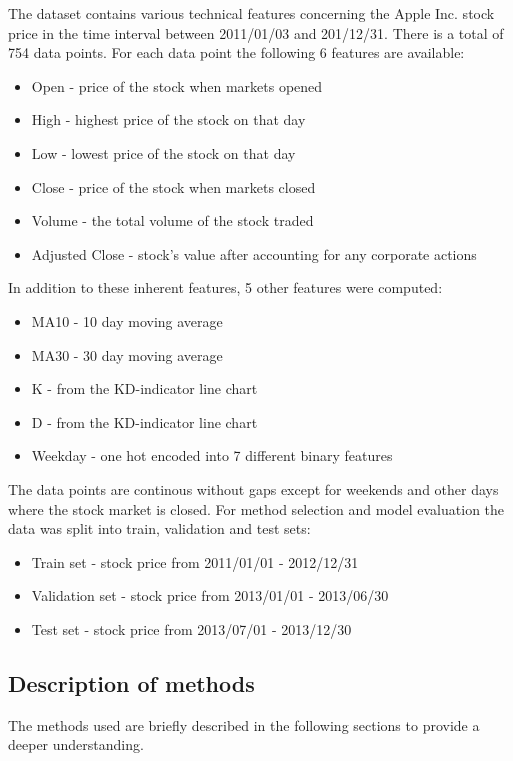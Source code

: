 \documentclass[utf8x]{ctexart}
\begin{document}
The dataset contains various technical features concerning the Apple Inc. stock price in the time interval between 2011/01/03 and 201/12/31. There is a total of 754 data points.
For each data point the following 6 features are available:
\begin{itemize}
  \item Open - price of the stock when markets opened
  \item High - highest price of the stock on that day
  \item Low - lowest price of the stock on that day
  \item Close - price of the stock when markets closed
  \item Volume - the total volume of the stock traded
  \item Adjusted Close - stock's value after accounting for any corporate actions
\end{itemize}

In addition to these inherent features, 5 other features were computed:
\begin{itemize}
  \item MA10 - 10 day moving average
  \item MA30 - 30 day moving average
  \item K - from the KD-indicator line chart
  \item D - from the KD-indicator line chart
  \item Weekday - one hot encoded into 7 different binary features
\end{itemize}

The data points are continous without gaps except for weekends and other days where the stock market is closed.
For method selection and model evaluation the data was split into train, validation and test sets:
\begin{itemize}
  \item Train set - stock price from 2011/01/01 - 2012/12/31
  \item Validation set - stock price from 2013/01/01 - 2013/06/30
  \item Test set - stock price from 2013/07/01 - 2013/12/30
\end{itemize}


\subsection{Description of methods}

The methods used are briefly described in the following sections to provide a deeper understanding.
\end{document}
